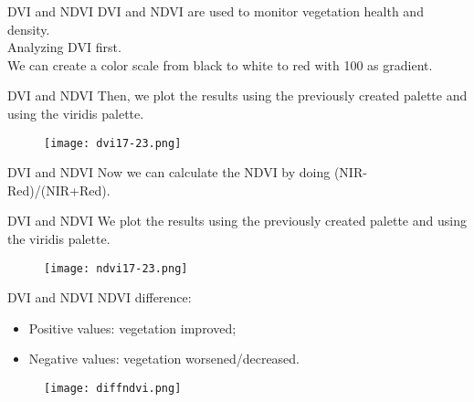 \documentclass{beamer}
\begin{document}
\begin{frame}{DVI and NDVI}
    DVI and NDVI are used to monitor vegetation health and density.
    \\ Analyzing DVI first.
    \\ We can create a color scale from black to white to red with 100 as gradient.
     
\end{frame}

\begin{frame}{DVI and NDVI}
    Then, we plot the results using the previously created palette and using the viridis palette.
     
     \begin{figure}
         \centering
         \texttt{[image: dvi17-23.png]}
     \end{figure}
\end{frame}

\begin{frame}{DVI and NDVI}
   Now we can calculate the NDVI by doing (NIR-Red)/(NIR+Red).
     
\end{frame}

\begin{frame}{DVI and NDVI}
    We plot the results using the previously created palette and using the viridis palette.
     
     \begin{figure}
         \centering
         \texttt{[image: ndvi17-23.png]}
     \end{figure}
\end{frame}

\begin{frame}{DVI and NDVI}
    NDVI difference:
    \\ \begin{itemize}
        \item Positive values:  vegetation improved;
        \item Negative values: vegetation worsened/decreased.
    \end{itemize} 
     
     \begin{figure}
         \centering
         \texttt{[image: diffndvi.png]}
     \end{figure}
\end{frame}
\end{document}
